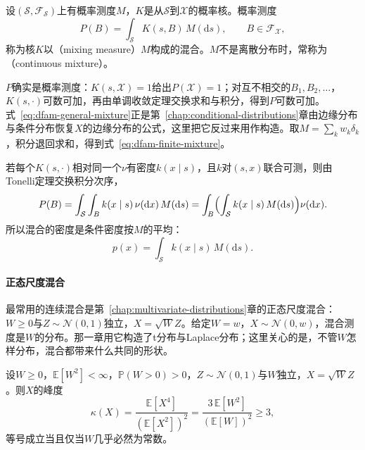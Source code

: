 \begin{definition}[一般混合]
\label{def:dfam-general-mixture}
设$(\mathcal{S},\mathcal{F}_{\mathcal{S}})$上有概率测度$M$，$K$是从$\mathcal{S}$到$\mathcal{X}$的概率核。概率测度
\begin{equation}
  P(B)=\int_{\mathcal{S}}K(s,B)\,M(\mathrm{d}s),\qquad B\in\mathcal{F}_{\mathcal{X}},
  \label{eq:dfam-general-mixture}
\end{equation}
称为核$K$以（mixing measure）$M$构成的混合。$M$不是离散分布时，常称为（continuous mixture）。
\end{definition}

$P$确实是概率测度：$K(s,\mathcal{X})=1$给出$P(\mathcal{X})=1$；对互不相交的$B_1,B_2,\dots$，$K(s,\cdot)$可数可加，再由单调收敛定理交换求和与积分，得到$P$可数可加。式~\eqref{eq:dfam-general-mixture}正是第~\ref{chap:conditional-distributions}章由边缘分布与条件分布恢复$X$的边缘分布的公式，这里把它反过来用作构造。取$M=\sum_kw_k\delta_k$，积分退回求和，得到式~\eqref{eq:dfam-finite-mixture}。

若每个$K(s,\cdot)$相对同一个$\nu$有密度$k(x\mid s)$，且$k$对$(s,x)$联合可测，则由Tonelli定理交换积分次序，
\[
  P(B)=\int_{\mathcal{S}}\int_Bk(x\mid s)\,\nu(\mathrm{d}x)\,M(\mathrm{d}s)=\int_B\Bigl(\int_{\mathcal{S}}k(x\mid s)\,M(\mathrm{d}s)\Bigr)\nu(\mathrm{d}x).
\]
所以混合的密度是条件密度按$M$的平均：
\begin{equation}
  p(x)=\int_{\mathcal{S}}k(x\mid s)\,M(\mathrm{d}s).
  \label{eq:dfam-mixture-density}
\end{equation}

\paragraph{正态尺度混合}
最常用的连续混合是第~\ref{chap:multivariate-distributions}章的正态尺度混合：$W\geq0$与$Z\sim\mathcal{N}(0,1)$独立，$X=\sqrt{W}Z$。给定$W=w$，$X\sim\mathcal{N}(0,w)$，混合测度是$W$的分布。那一章用它构造了t分布与Laplace分布；这里关心的是，不管$W$怎样分布，混合都带来什么共同的形状。

\begin{theorem}[尺度混合使峰度不小于三]
\label{thm:dfam-scale-mixture-kurtosis}
设$W\geq0$，$\mathbb{E}[W^{2}]<\infty$，$\mathbb{P}(W>0)>0$，$Z\sim\mathcal{N}(0,1)$与$W$独立，$X=\sqrt{W}Z$。则$X$的峰度
\begin{equation}
  \kappa(X)=\frac{\mathbb{E}[X^{4}]}{(\mathbb{E}[X^{2}])^{2}}=\frac{3\,\mathbb{E}[W^{2}]}{(\mathbb{E}[W])^{2}}\geq3 ,
  \label{eq:dfam-scale-kurtosis}
\end{equation}
等号成立当且仅当$W$几乎必然为常数。
\end{theorem}

